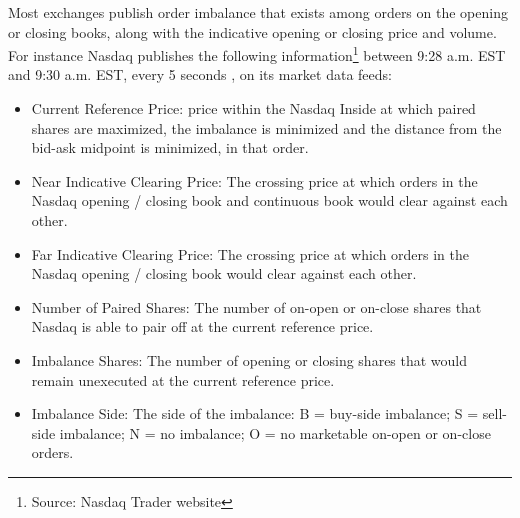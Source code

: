 Most exchanges publish order imbalance that exists among orders on the opening or closing books, along with the indicative opening or closing price and volume. For instance Nasdaq publishes the following information\footnote{Source: Nasdaq Trader website} between 9:28 a.m. EST and 9:30 a.m. EST,  every 5 seconds , on its market data feeds:
\begin{itemize}
\item  Current Reference Price: price within the Nasdaq Inside at which paired shares are maximized, the imbalance is minimized and the distance from the bid-ask midpoint is minimized, in that order.
\item  Near Indicative Clearing Price: The crossing price at which orders in the Nasdaq opening / closing book and continuous book would clear against each other. 
\item  Far Indicative Clearing Price: The crossing price at which orders in the Nasdaq opening / closing book would clear against each other. 
\item  Number of Paired Shares: The number of on-open or on-close shares that Nasdaq is able to pair off at the current reference price. 
\item  Imbalance Shares: The number of opening or closing shares that would remain unexecuted at the current reference price. 
\item  Imbalance Side: The side of the imbalance: B = buy-side imbalance; S = sell-side imbalance; N = no imbalance; O = no marketable on-open or on-close orders.
\end{itemize}



